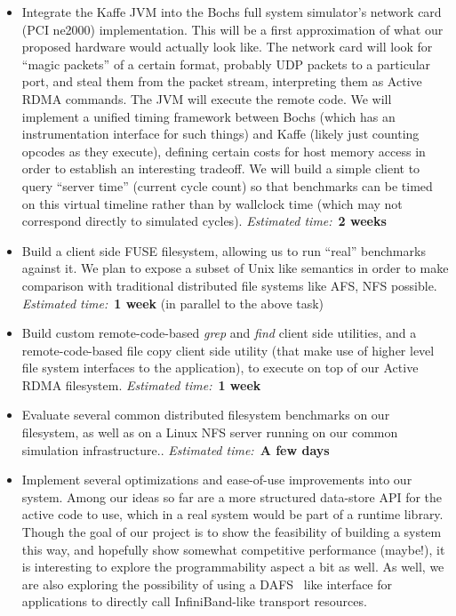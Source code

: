 \documentclass[10pt]{article}
\begin{document}
\begin{itemize}
\item Integrate the Kaffe JVM into the Bochs full system simulator's
  network card (PCI ne2000) implementation. This will be a first
  approximation of what our proposed hardware would actually look
  like. The network card will look for ``magic packets'' of a certain
  format, probably UDP packets to a particular port, and steal them
  from the packet stream, interpreting them as Active RDMA
  commands. The JVM will execute the remote code. We will implement a
  unified timing framework between Bochs (which has an instrumentation
  interface for such things) and Kaffe (likely just counting opcodes
  as they execute), defining certain costs for host memory access in
  order to establish an interesting tradeoff. We will build a simple
  client to query ``server time'' (current cycle count) so that
  benchmarks can be timed on this virtual timeline rather than by
  wallclock time (which may not correspond directly to simulated
  cycles). \emph{Estimated time:}~\textbf{2 weeks}

\item Build a client side FUSE filesystem, allowing us to run
  ``real'' benchmarks against it. We plan to expose a subset
  of Unix like semantics in order to make comparison with
  traditional distributed file systems like AFS, NFS possible.
  \emph{Estimated time:}~\textbf{1 week} (in parallel to the above task)

\item Build custom remote-code-based \emph{grep} and \emph{find}
  client side utilities, and a remote-code-based file copy client side
  utility (that make use of higher level file system interfaces to the
  application), to execute on top of our Active RDMA filesystem.
  \emph{Estimated time:}~\textbf{1 week}

\item Evaluate several common distributed filesystem benchmarks on our
  filesystem, as well as on a Linux NFS server running on our common
  simulation infrastructure.. \emph{Estimated time:}~\textbf{A few
    days}

\item Implement several optimizations and ease-of-use improvements
  into our system. Among our ideas so far are a more structured
  data-store API for the active code to use, which in a real system
  would be part of a runtime library. Though the goal of our project
  is to show the feasibility of building a system this way, and
  hopefully show somewhat competitive performance (maybe!), it is
  interesting to explore the programmability aspect a bit as well. As
  well, we are also exploring the possibility of using a
  DAFS~\cite{DAFS} like interface for applications to directly call
  InfiniBand-like transport resources.

\end{itemize}
\end{document}
